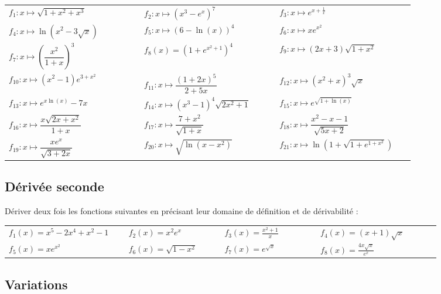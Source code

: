 \documentclass[oneside,12pt]{article}          %
\begin{document}
\renewcommand{\arraystretch}{2.2}
\begin{tabular}{p{0.3\linewidth}p{0.3\linewidth}p{0.3\linewidth}}
	$f_1:x\mapsto\sqrt{1+x^2+x^3}$ & $f_{2}:x\mapsto (x^3-e^x)^7$ & $f_3:x\mapsto e^{x+\frac{1}{x}}$ \\
	
	$f_4:x\mapsto \ln\left(x^2-3\sqrt{x}\right)$ & $f_5:x\mapsto\left(6-\ln(x)\right)^4$ & $f_6:x\mapsto xe^{x^2}$\\
	
	$f_{7}:x\mapsto  \left(\dfrac{x^2}{1+x} \right)^3$  & $f_{8}(x)= \left(1+e^{x^2+1}\right)^{4}$ & $f_9:x\mapsto(2x+3)\sqrt{1+x^2}$  \\

	$f_{10}:x\mapsto (x^2-1)e^{3+x^2}$ & $f_{11} :x\mapsto \dfrac{(1+2x)^5}{2+5x}$ &  $f_{12}:x\mapsto (x^2+x)^3\sqrt{x}$  \\

	$f_{13}:x\mapsto e^{x\ln(x)}-7x$ &	$f_{14}:x\mapsto(x^3-1)^4\sqrt{2x^2+1}$ & $f_{15}:x\mapsto e^{\sqrt{1+\ln(x)}}$  \\

	$f_{16}:x\mapsto \dfrac{x\sqrt{2x+x^2}}{1+x}$  & $f_{17}:x\mapsto \dfrac{7+x^2}	{\sqrt{1+x}}$ & $f_{18}:x\mapsto \dfrac{x^2-x-1}{\sqrt{5x+2}}$ \\

	$f_{19}:x\mapsto\dfrac{xe^x}{\sqrt{3+2x}}$ & $f_{20}:x\mapsto \sqrt{\ln(x-x^2)}$ & $f_{21}:x\mapsto \ln\left(1+\sqrt{1+e^{1+x^2}}\right)$
\end{tabular}




\subsection{Dérivée seconde}
Dériver deux fois les fonctions suivantes en précisant leur domaine de définition et de dérivabilité :  

\renewcommand{\arraystretch}{1.8}
\begin{tabular}{p{0.25\linewidth}p{0.2\linewidth}p{0.2\linewidth}p{0.25\linewidth}}
$f_1(x)=x^5-2x^4+x^2-1$ & $f_2(x)=x^2e^x$ & $f_3(x)=\frac{x^2+1}{x}$ & $f_4(x)=(x+1)\sqrt{x}$\\
$f_5(x)=xe^{x^2}$ & $f_6(x)=\sqrt{1-x^2}$ & $f_7(x)=e^{\sqrt{x}}$ & $f_8(x)=\frac{4x\sqrt{x}}{e^x}$
\end{tabular}



\subsection{Variations}
\end{document}
